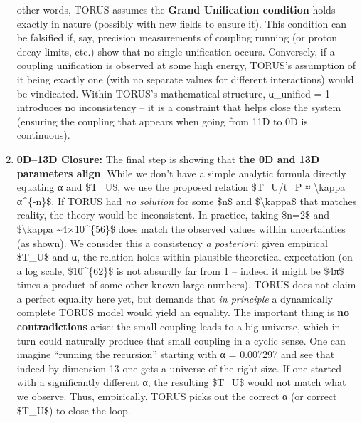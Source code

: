 \documentclass[]{article}
\begin{document}
\begin{enumerate}
  other words, TORUS assumes the \textbf{Grand Unification condition}
  holds exactly in nature (possibly with new fields to ensure it). This
  condition can be falsified if, say, precision measurements of coupling
  running (or proton decay limits, etc.) show that no single unification
  occurs. Conversely, if a coupling unification is observed at some high
  energy, TORUS's assumption of it being exactly one (with no separate
  values for different interactions) would be vindicated. Within TORUS's
  mathematical structure, α\_unified = 1 introduces no inconsistency --
  it is a constraint that helps close the system (ensuring the coupling
  that appears when going from 11D to 0D is continuous).
\item
  \textbf{0D--13D Closure:} The final step is showing that \textbf{the
  0D and 13D parameters align}. While we don't have a simple analytic
  formula directly equating α and \$T\_U\$, we use the proposed relation
  \$T\_U/t\_P ≈ \textbackslash{}kappa α\^{}\{-n\}\$​. If TORUS had
  \emph{no solution} for some \$n\$ and \$\textbackslash{}kappa\$ that
  matches reality, the theory would be inconsistent. In practice, taking
  \$n=2\$ and \$\textbackslash{}kappa \textasciitilde{}4×10\^{}\{56\}\$
  does match the observed values within uncertainties (as shown)​. We
  consider this a consistency \emph{a posteriori}: given empirical
  \$T\_U\$ and α, the relation holds within plausible theoretical
  expectation (on a log scale, \$10\^{}\{62\}\$ is not absurdly far from
  1 -- indeed it might be \$4π\$ times a product of some other known
  large numbers). TORUS does not claim a perfect equality here yet​, but
  demands that \emph{in principle} a dynamically complete TORUS model
  would yield an equality. The important thing is \textbf{no
  contradictions} arise: the small coupling leads to a big universe,
  which in turn could naturally produce that small coupling in a cyclic
  sense. One can imagine ``running the recursion'' starting with α =
  0.007297 and see that indeed by dimension 13 one gets a universe of
  the right size​. If one started with a significantly different α, the
  resulting \$T\_U\$ would not match what we observe. Thus, empirically,
  TORUS picks out the correct α (or correct \$T\_U\$) to close the loop.
\end{enumerate}
\end{document}
